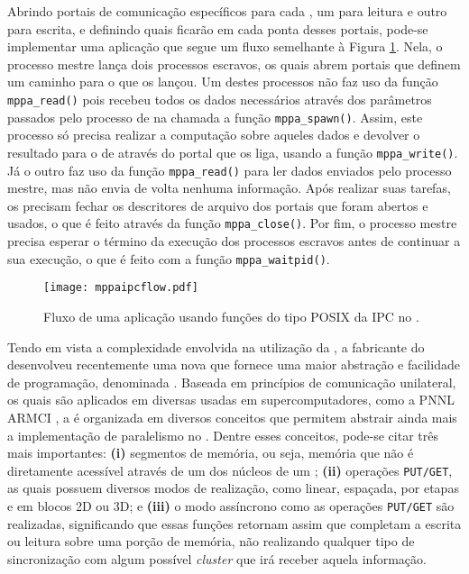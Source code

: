 Abrindo portais de comunicação específicos para cada \cluster, um para leitura e outro para escrita, e definindo quais \clusters ficarão em cada ponta desses portais, pode-se implementar uma aplicação que segue um fluxo semelhante à Figura \ref{fig:mppaipcflow}. Nela, o processo mestre lança dois processos escravos, os quais abrem portais que definem um caminho para o \cluster que os lançou. Um destes processos não faz uso da função \texttt{mppa\_read()} pois recebeu todos os dados necessários através dos parâmetros passados pelo processo de \IO na chamada a função \texttt{mppa\_spawn()}. Assim, este processo só precisa realizar a computação sobre aqueles dados e devolver o resultado para o \cluster de \IO através do portal que os liga, usando a função \texttt{mppa\_write()}. Já o outro \cluster faz uso da função \texttt{mppa\_read()} para ler dados enviados pelo processo mestre, mas não envia de volta nenhuma informação. Após realizar suas tarefas, os \CCs precisam fechar os descritores de arquivo dos portais que foram abertos e usados, o que é feito através da função \texttt{mppa\_close()}. Por fim, o processo mestre precisa esperar o término da execução dos processos escravos antes de continuar a sua execução, o que é feito com a função \texttt{mppa\_waitpid()}.

\begin{figure}[tb]
  \centering
  \caption{Fluxo de uma aplicação usando funções do tipo POSIX da IPC no \mppa.}
  \label{fig:mppaipcflow}
  \texttt{[image: mppaipcflow.pdf]}
\end{figure}

Tendo em vista a complexidade envolvida na utilização da \API \IPC, a fabricante do \mppa desenvolveu recentemente uma nova \API que fornece uma maior abstração e facilidade de programação, denominada \ASYNC.
Baseada em princípios de comunicação unilateral, os quais são aplicados em diversas \APIs usadas em supercomputadores, como a \API PNNL ARMCI \cite{armciapproach}, a \ASYNC é organizada em diversos conceitos que permitem abstrair ainda mais a implementação de paralelismo no \mppa. Dentre esses conceitos, pode-se citar três mais importantes: \textbf{(i)} segmentos de memória, ou seja, memória que não é diretamente acessível através de um dos núcleos de um \cluster; \textbf{(ii)} operações \texttt{PUT/GET}, as quais possuem diversos modos de realização, como linear, espaçada, por etapas e em blocos 2D ou 3D; e \textbf{(iii)} o modo assíncrono como as operações \texttt{PUT/GET} são realizadas, significando que essas funções retornam assim que completam a escrita ou leitura sobre uma porção de memória, não realizando qualquer tipo de sincronização com algum possível \textit{cluster} que irá receber aquela informação.
 

